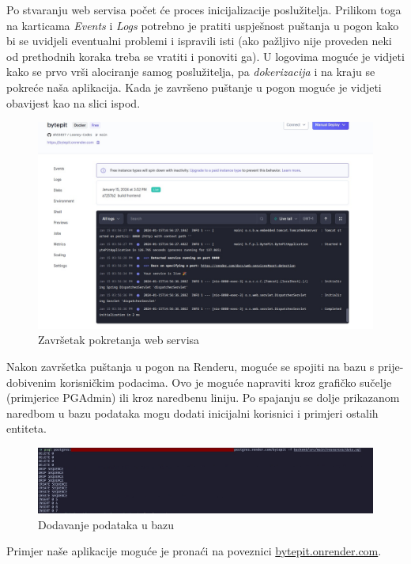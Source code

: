 \begin{itemize}
	Po stvaranju web servisa počet će proces inicijalizacije poslužitelja. Prilikom toga na karticama \textit{Events} i \textit{Logs} potrebno je pratiti uspješnost puštanja u pogon kako bi se uvidjeli eventualni problemi i ispravili isti (ako pažljivo nije proveden neki od prethodnih koraka treba se vratiti i ponoviti ga). U logovima moguće je vidjeti kako se prvo vrši alociranje samog poslužitelja, pa \textit{dokerizacija} i na kraju se pokreće naša aplikacija. Kada je završeno puštanje u pogon moguće je vidjeti obavijest kao na slici ispod.
	\begin{figure}[H]
		\includegraphics[scale=0.3]{slike/deployment4.jpeg}
		\centering
		\caption{Završetak pokretanja web servisa}
		\label{deployment4}
	\end{figure}
\end{itemize}

Nakon završetka puštanja u pogon na Renderu, moguće se spojiti na bazu s prije-dobivenim korisničkim podacima. Ovo je moguće napraviti kroz grafičko sučelje (primjerice PGAdmin) ili kroz naredbenu liniju. Po spajanju se dolje prikazanom naredbom u bazu podataka mogu dodati inicijalni korisnici i primjeri ostalih entiteta.

\begin{figure}[H]
	\includegraphics[scale=0.25]{slike/deployment5.jpeg}
	\centering
	\caption{Dodavanje podataka u bazu}
	\label{deployment5}
\end{figure}

Primjer naše aplikacije moguće je pronaći na poveznici \href{https://bytepit.onrender.com/}{bytepit.onrender.com}. 


\eject 